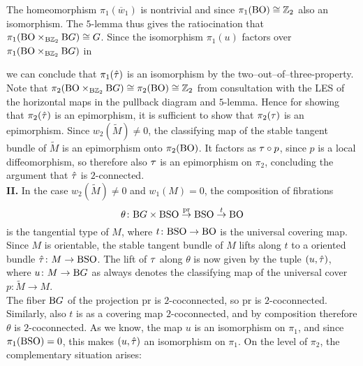     The homeomorphism $\pi_1(\overline{w}_1)$ is nontrivial and since $\pi_1(\mathrm{BO}) \cong \mathbb{Z}_2$ also an isomorphism. 
    The $5$-lemma thus gives the ratiocination that $\pi_1(\mathrm{BO}\times_{\mathrm{B}\mathbb{Z}_2} \mathrm{B} G) \cong G$.
    Since the isomorphism $\pi_1(u)$ factors over $\pi_1(\mathrm{BO}\times_{\mathrm{B}\mathbb{Z}_2}\mathrm{B} G)$ in 
    \begin{center}
    \end{center}
    we can conclude that $\pi_1(\hat{\tau})$ is an isomorphism by the two--out--of--three-property.
    Note that $\pi_2(\mathrm{BO}\times_{\mathrm{B}\mathbb{Z}_2}\mathrm{B} G) \cong \pi_2(\mathrm{BO}) \cong \mathbb{Z}_2$ from consultation with the LES of the horizontal maps in the pullback diagram and $5$-lemma.
    Hence for showing that $\pi_2(\hat{\tau})$ is an epimorphism, it is sufficient to show that $\pi_2(\tau)$ is an epimorphism.
    Since $w_2(\widetilde{M}) \neq 0$, the classifying map of the stable tangent bundle of $\widetilde{M}$ is an epimorphism onto $\pi_2(\mathrm{BO})$.
    It factors as $\tau\circ p$, since $p$ is a local diffeomorphism, so therefore also $\tau$ is an epimorphism on $\pi_2$, concluding the argument that $\hat{\tau}$ is $2$-connected.\\ 
    \textbf{II.} In the case $w_2(\widetilde{M}) \neq 0$ and $w_1(M) = 0$, the composition of fibrations
    \begin{equation*}
        \theta\colon \mathrm{B} G \times \mathrm{BSO} \overset{\mathrm{pr}}{\to} \mathrm{BSO} \overset{t}{\to} \mathrm{BO}
    \end{equation*}
    is the tangential type of $M$, where $t\colon \mathrm{BSO} \to \mathrm{BO}$ is the universal covering map.
    Since $M$ is orientable, the stable tangent bundle of $M$ lifts along $t$ to a oriented bundle $\hat{\tau} \colon M \to \mathrm{BSO}$.
    The lift of $\tau$ along $\theta$ is now given by the tuple $(u,\hat{\tau})$, where $u\colon M \to \mathrm{B} G$ as always denotes the classifying map of the universal cover $p\colon \widetilde{M} \to M$.\\
    The fiber $\mathrm{B} G$ of the projection $\mathrm{pr}$ is $2$-coconnected, so $\mathrm{pr}$ is $2$-coconnected.
    Similarly, also $t$ is as a covering map $2$-coconnected, and by composition therefore $\theta$ is $2$-coconnected.
    As we know, the map $u$ is an isomorphism on $\pi_1$, and since $\pi_1(\mathrm{BSO}) = 0$, this makes $(u,\hat{\tau})$ an isomorphism on $\pi_1$.
    On the level of $\pi_2$, the complementary situation arises:\\
